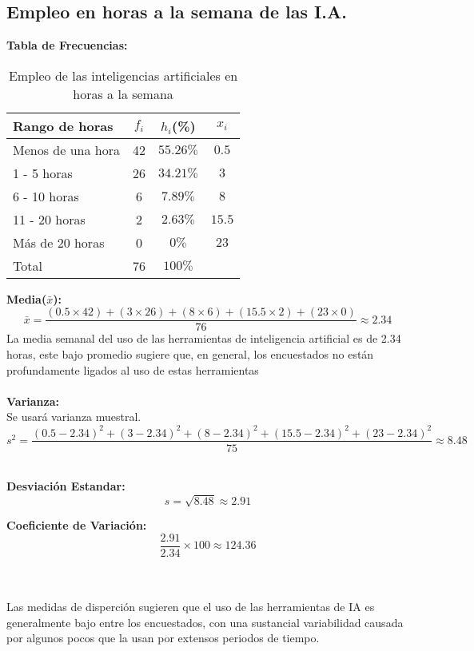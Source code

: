 \subsection{Empleo en horas a la semana de las I.A.}
\textbf{Tabla de Frecuencias:} \\

\begin{table}[h!]
	\centering
	\renewcommand{\arraystretch}{1.5} 
	\begin{tabular}{l c c c }
		\hline
		{Rango de horas} & {\(f_i\)} & \textit{\(h_i\)}(\%) & \textit{\(x_i\)}\\
		\hline
		Menos de una hora	& 42 & \(55.26\%\) & \(0.5\)	\\
		1 - 5 horas			& 26 & \(34.21\%\) & \(3\)		\\
		6 - 10 horas 		& 6  & \(7.89\%\)  & \(8\)		\\
		11 - 20 horas 		& 2  & \(2.63\%\)  & \(15.5\)	\\
		Más de 20 horas		& 0  & \(0\%\)     & \(23\)		\\
		\hline
		Total				& 76 & \(100\%\) \\
		\hline
	\end{tabular}
	\caption{Empleo de las inteligencias artificiales en horas a la semana}
	\label{tabla:EmpleoEnHoras}
\end{table}

\textbf{Media(\(\bar{x}\)):}
\begin{equation*}
	\bar{x} = \frac{(0.5 \times 42) + (3 \times 26) + (8 \times 6) + (15.5 \times 2) + (23 \times 0)}{76} \approx 2.34
\end{equation*}
La media semanal del uso de las herramientas de inteligencia artificial es de 2.34 horas, este bajo promedio sugiere que, en general, los encuestados no están profundamente ligados al uso de estas herramientas \\ \\

\noindent\textbf{Varianza:} \\
Se usará varianza muestral.
\begin{equation*}
	s^2 = \frac{(0.5 - 2.34)^2 + (3 - 2.34)^2 + (8 - 2.34)^2 + (15.5 - 2.34)^2 + (23 - 2.34)^2}{75} \approx 8.48
\end{equation*} \\

\begin{minipage}[t]{0.5\textwidth}
	\noindent\textbf{Desviación Estandar:}
	\begin{equation*}
		s = \sqrt{8.48} \approx 2.91
	\end{equation*}
	
\end{minipage}%
\hfill
\begin{minipage}[t]{0.5\textwidth}
	\noindent\textbf{Coeficiente de Variación:}
	\begin{equation*}
		\frac{2.91}{2.34} \times 100 \approx 124.36
	\end{equation*}  
\end{minipage} \\ \\

Las medidas de disperción sugieren que el uso de las herramientas de IA es generalmente bajo entre los encuestados, con una sustancial variabilidad causada por algunos pocos que la usan por extensos periodos de tiempo.